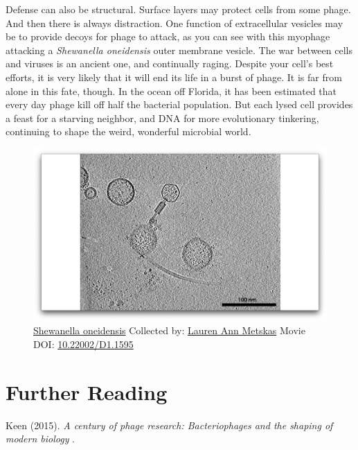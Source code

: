 \documentclass[]{tufte-book}
\begin{document}
Defense can also be structural. Surface layers may protect cells from
some phage. And then there is always distraction. One function of
extracellular vesicles may be to provide decoys for phage to attack, as
you can see with this myophage attacking a \emph{Shewanella oneidensis}
outer membrane vesicle. The war between cells and viruses is an ancient
one, and continually raging. Despite your cell's best efforts, it is
very likely that it will end its life in a burst of phage. It is far
from alone in this fate, though. In the ocean off Florida, it has been
estimated that every day phage kill off half the bacterial population.
But each lysed cell provides a feast for a starving neighbor, and DNA
for more evolutionary tinkering, continuing to shape the weird,
wonderful microbial world.





\begin{figure}
\includegraphics{movie_stills/10_10} \caption[\protect\hyperlink{tree}{Shewanella oneidensis} Collected
by: \protect\hyperlink{lauren_ann_metskas}{Lauren Ann Metskas} Movie
DOI: \href{https://doi.org/10.22002/D1.1595}{10.22002/D1.1595}]{\protect\hyperlink{tree}{Shewanella oneidensis} Collected
by: \protect\hyperlink{lauren_ann_metskas}{Lauren Ann Metskas} Movie
DOI: \href{https://doi.org/10.22002/D1.1595}{10.22002/D1.1595}}\label{fig:10-10}
\end{figure}

\section{Further Reading}\label{further-reading}

Keen (2015). \emph{A century of phage research: Bacteriophages and the
shaping of modern biology} \citep{keen2015}.
\end{document}

